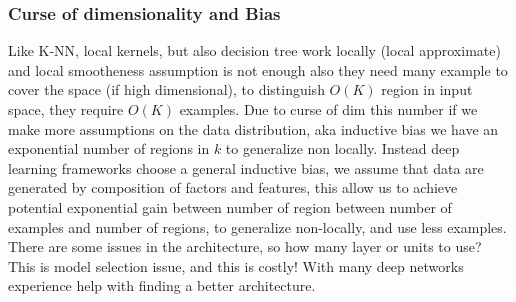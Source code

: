\documentclass[12pt]{book}
\begin{document}
\subsubsection{Curse of dimensionality and Bias}
Like K-NN, local kernels, but also decision tree work locally (local approximate) and local smootheness assumption is not enough also they need many example to cover the space (if high dimensional), to distinguish $O(K)$ region in input space, they require $O(K)$ examples.\newline
Due to curse of dim this number if we make more assumptions on the data distribution, aka inductive bias we have an exponential number of regions in $k$ to generalize non locally.\newline
Instead deep learning frameworks choose a general inductive bias, we assume that data are generated by composition of factors and features, this allow us to achieve potential exponential gain between number of region between number of examples and number of regions, to generalize non-locally, and use less examples. There are some issues in the architecture, so how many layer or units to use? This is model selection issue, and this is costly! With many deep networks experience help with finding a better architecture.
\end{document}
